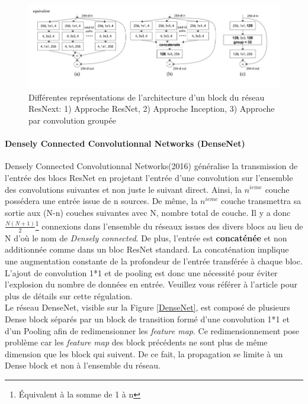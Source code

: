 \begin{figure}
    \centering
    \includegraphics[scale=0.4]{./tex/convolution-network/classifier/resnext.png}
    \caption{Différentes représentations de l'architecture d'un block du réseau ResNext: 1) Approche ResNet, 2) Approche Inception, 3) Approche par convolution groupée}
    \label{resnext}
\end{figure}

\paragraph{Densely Connected Convolutionnal Networks (DenseNet)}

\noindent Densely Connected Convolutionnal Networks\cite{densely}(2016) généralise la transmission de l'entrée des blocs ResNet en projetant l'entrée d'une convolution sur l'ensemble des convolutions suivantes et non juste le suivant direct. Ainsi, la $n^{ieme}$ couche possédera une entrée issue de n sources. De même, la $n^{ieme}$ couche transmettra sa sortie aux (N-n) couches suivantes avec N, nombre total de couche. Il y a donc $\frac{N(N+1)}{2}$\footnote{Équivalent à la somme de 1 à n} connexions dans l'ensemble du réseaux issues des divers blocs au lieu de N d'où le nom de \textit{Densely connected}. De plus, l'entrée est \textbf{concaténée} et non additionnée comme dans un bloc ResNet standard. La concaténation implique une augmentation constante de la profondeur de l'entrée transférée à chaque bloc. L'ajout de convolution 1*1 et de pooling est donc une nécessité pour éviter l'explosion du nombre de données en entrée. Veuillez vous référer à l'article \cite{densely} pour plus de détails sur cette régulation. \\

\noindent Le réseau DenseNet, visible sur la Figure \ref{DenseNet}, est composé de plusieurs Dense block séparés par un block de transition formé d'une convolution 1*1 et d'un Pooling afin de redimensionner les \textit{feature map}. Ce redimensionnement pose problème car les \textit{feature map} des block précédents ne sont plus de même dimension que les block qui suivent. De ce fait, la propagation se limite à un Dense block et non à l'ensemble du réseau.

